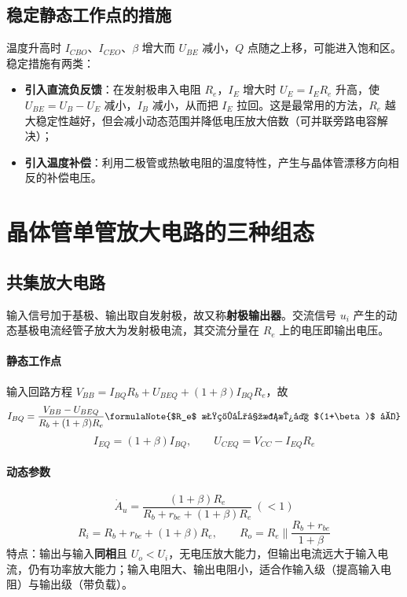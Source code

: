 \subsection{稳定静态工作点的措施}

温度升高时 $I_{CBO}$、$I_{CEO}$、$\beta$ 增大而 $U_{BE}$ 减小，$Q$ 点随之上移，可能进入饱和区。稳定措施有两类：
\begin{itemize}
    \item \textbf{引入直流负反馈}：在发射极串入电阻 $R_e$，$I_E$ 增大时 $U_E=I_E R_e$ 升高，使 $U_{BE}=U_B-U_E$ 减小，$I_B$ 减小，从而把 $I_E$ 拉回。这是最常用的方法，$R_e$ 越大稳定性越好，但会减小动态范围并降低电压放大倍数（可并联旁路电容解决）；
    \item \textbf{引入温度补偿}：利用二极管或热敏电阻的温度特性，产生与晶体管漂移方向相反的补偿电压。
\end{itemize}

\section{晶体管单管放大电路的三种组态}

\subsection{共集放大电路}

输入信号加于基极、输出取自发射极，故又称\textbf{射极输出器}。交流信号 $u_i$ 产生的动态基极电流经管子放大为发射极电流，其交流分量在 $R_e$ 上的电压即输出电压。

\paragraph{静态工作点}
输入回路方程 $V_{BB}=I_{BQ}R_b+U_{BEQ}+(1+\beta)I_{BQ}R_e$，故
\begin{equation}
I_{BQ}=\frac{V_{BB}-U_{BEQ}}{R_b+(1+\beta)R_e}
\formulaNote{$R_e$ 折算到基极放大 $(1+\beta)$ 倍}
\end{equation}
\begin{equation}
I_{EQ}=(1+\beta)I_{BQ},
\qquad
U_{CEQ}=V_{CC}-I_{EQ}R_e
\end{equation}

\paragraph{动态参数}
\begin{equation}
\dot A_u=\frac{(1+\beta)R_e}{R_b+r_{be}+(1+\beta)R_e}\ (<1)
\end{equation}
\begin{equation}
R_i=R_b+r_{be}+(1+\beta)R_e,
\qquad
R_o=R_e\parallel\frac{R_b+r_{be}}{1+\beta}
\end{equation}
特点：输出与输入\textbf{同相}且 $U_o<U_i$，无电压放大能力，但输出电流远大于输入电流，仍有功率放大能力；输入电阻大、输出电阻小，适合作输入级（提高输入电阻）与输出级（带负载）。

